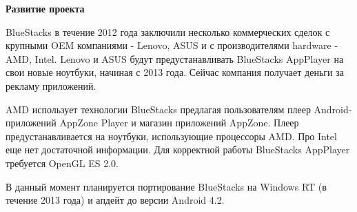 \textbf{Развитие проекта}

BlueStacks в течение 2012 года заключили несколько коммерческих сделок с крупными OEM компаниями - Lenovo, ASUS и с производителями hardware - AMD, Intel. Lenovo и ASUS будут предустанавливать BlueStacks AppPlayer на свои новые ноутбуки, начиная с 2013 года. Сейчас компания получает деньги за рекламу приложений.

AMD использует технологии BlueStacks предлагая пользователям плеер Android-приложений AppZone Player и магазин приложений AppZone. Плеер предустанавливается на ноутбуки, использующие процессоры AMD. Про Intel еще нет достаточной информации. Для корректной работы BlueStacks AppPlayer требуется OpenGL ES 2.0.

В данный момент планируется портирование BlueStacks на Windows RT (в течение 2013 года) и апдейт до версии Android 4.2.





